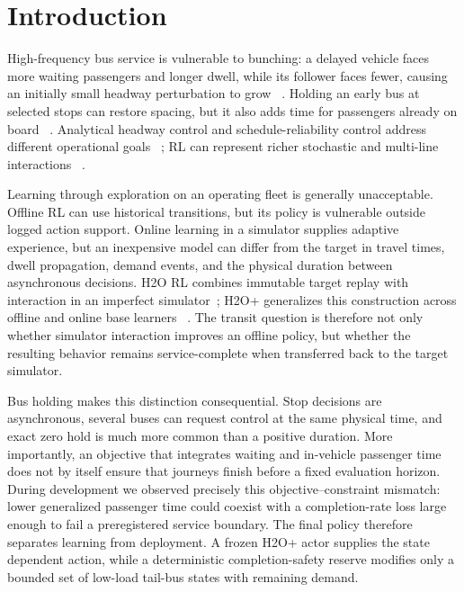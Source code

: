 \section{Introduction}
\label{sec:intro}

High-frequency bus service is vulnerable to bunching: a delayed vehicle faces
more waiting passengers and longer dwell, while its follower faces fewer,
causing an initially small headway perturbation to grow
~\citep{rezazada2024review}. Holding an early bus at selected stops can restore
spacing, but it also adds time for passengers already on board
~\citep{delgado2012holding}. Analytical headway control and schedule-reliability
control address different operational goals
~\citep{daganzo2009headway,xuan2011dynamic}; RL can represent richer stochastic
and multi-line interactions
~\citep{alesiani2018reinforcement,wang2020real,wang2023multiobjective}.

Learning through exploration on an operating fleet is generally unacceptable.
Offline RL can use historical transitions, but its policy is vulnerable outside
logged action support. Online learning in a simulator supplies adaptive
experience, but an inexpensive model can differ from the target in travel
times, dwell propagation, demand events, and the physical duration between
asynchronous decisions. H2O RL combines immutable
target replay with interaction in an imperfect simulator~\citep{niu2022h2o};
H2O+ generalizes this construction across offline and online base learners
~\citep{niu2025h2oplus}. The transit question is therefore not only whether
simulator interaction improves an offline policy, but whether the resulting
behavior remains service-complete when transferred back to the target
simulator.

Bus holding makes this distinction consequential. Stop decisions are
asynchronous, several buses can request control at the same physical time, and
exact zero hold is much more common than a positive duration. More importantly,
an objective that integrates waiting and in-vehicle passenger time does not by
itself ensure that journeys finish before a fixed evaluation horizon. During
development we observed precisely this objective--constraint mismatch: lower
generalized passenger time could coexist with a completion-rate loss large
enough to fail a preregistered service boundary. The final policy therefore
separates learning from deployment. A frozen H2O+ actor supplies the state
dependent action, while a deterministic completion-safety reserve modifies
only a bounded set of low-load tail-bus states with remaining demand.

